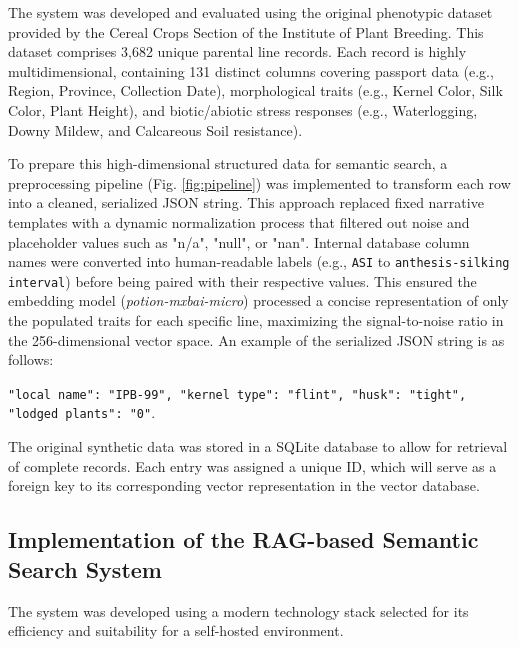 \documentclass[journal]{./IEEE/IEEEtran}
\begin{document}
The system was developed and evaluated using the original phenotypic dataset provided by the Cereal Crops Section of the Institute of Plant Breeding. This dataset comprises 3,682 unique parental line records. Each record is highly multidimensional, containing 131 distinct columns covering passport data (e.g., Region, Province, Collection Date), morphological traits (e.g., Kernel Color, Silk Color, Plant Height), and biotic/abiotic stress responses (e.g., Waterlogging, Downy Mildew, and Calcareous Soil resistance).

To prepare this high-dimensional structured data for semantic search, a preprocessing pipeline (Fig. \ref{fig:pipeline}) was implemented to transform each row into a cleaned, serialized JSON string. This approach replaced fixed narrative templates with a dynamic normalization process that filtered out noise and placeholder values such as "n/a", "null", or "nan". Internal database column names were converted into human-readable labels (e.g., \texttt{ASI} to \texttt{anthesis-silking interval}) before being paired with their respective values. This ensured the embedding model (\textit{potion-mxbai-micro}) processed a concise representation of only the populated traits for each specific line, maximizing the signal-to-noise ratio in the 256-dimensional vector space. An example of the serialized JSON string is as follows:

\texttt{{"local name": "IPB-99", "kernel type": "flint", "husk": "tight", "lodged plants": "0"}}.


The original synthetic data was stored in a SQLite database to allow for retrieval of complete records. Each entry was assigned a unique ID, which will serve as a foreign key to its corresponding vector representation in the vector database.

\subsection{Implementation of the RAG-based Semantic Search System}
The system was developed using a modern technology stack selected for its efficiency and suitability for a self-hosted environment.
\end{document}
